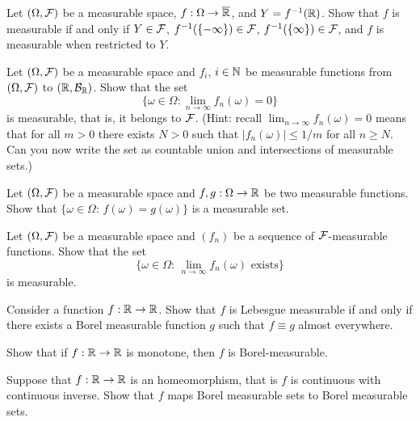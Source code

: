\begin{problem}
    Let $(\Omega,\mathcal F)$ be a measurable space, $f:\Omega\to \overline{\mathbb R}$, and $Y = f^{-1}(\mathbb R)$. Show that $f$ is measurable if and only if $Y\in \mathcal F$, $f^{-1}(\{-\infty\})\in\mathcal F$, $f^{-1}(\{\infty\})\in \mathcal F$, and $f$ is measurable when restricted to $Y$.  
\end{problem}

\begin{problem}
    Let $(\Omega,\mathcal F)$ be a measurable space and $f_i$, $i\in \mathbb N$ be measurable functions from $(\Omega,\mathcal F)$ to $(\mathbb R,\mathcal B_{\mathbb R})$. Show that the set 
    \begin{equation*}
        \{\omega\in \Omega: \lim_{n\to \infty} f_n(\omega) = 0\}
    \end{equation*}
    is measurable, that is, it belongs to $\mathcal F$.
    (Hint: recall $\lim_{n\to \infty} f_n(\omega) = 0$ means that for all $m>0$ there exists $N>0$ such that $|f_n(\omega)|\leq 1/m$ for all $n\geq N$. Can you now write the set as countable union and intersections of measurable sets.)
\end{problem}

\begin{problem}
    Let  $(\Omega,\mathcal F)$ be a measurable space and $f,g:\Omega\to \mathbb R$ be two measurable functions. Show that $\{\omega\in \Omega:\, f(\omega) = g(\omega)\}$ is a measurable set.
\end{problem}

\begin{problem}
    Let  $(\Omega,\mathcal F)$ be a measurable space and $(f_n)$ be a sequence of $\mathcal F$-measurable functions. Show that the set 
    \begin{equation*}
        \{\omega\in \Omega:\, \lim_{n\to\infty} f_n(\omega) \text{ exists}\}
    \end{equation*}
    is measurable.
\end{problem}

\begin{problem} Consider a function $f:\mathbb R\to \mathbb R$. Show that $f$ is Lebesgue measurable if and only if there exists a Borel measurable function $g$ such that $f\equiv g$ almost everywhere.
\end{problem}

\begin{problem} Show that if $f:\mathbb R\to\mathbb R$ is monotone, then $f$ is Borel-measurable.
\end{problem}

\begin{problem} Suppose that $f:\mathbb R\to \mathbb R$ is an homeomorphism, that is $f$ is continuous with continuous inverse. Show that $f$ maps Borel measurable sets to Borel measurable sets.   
\end{problem}

